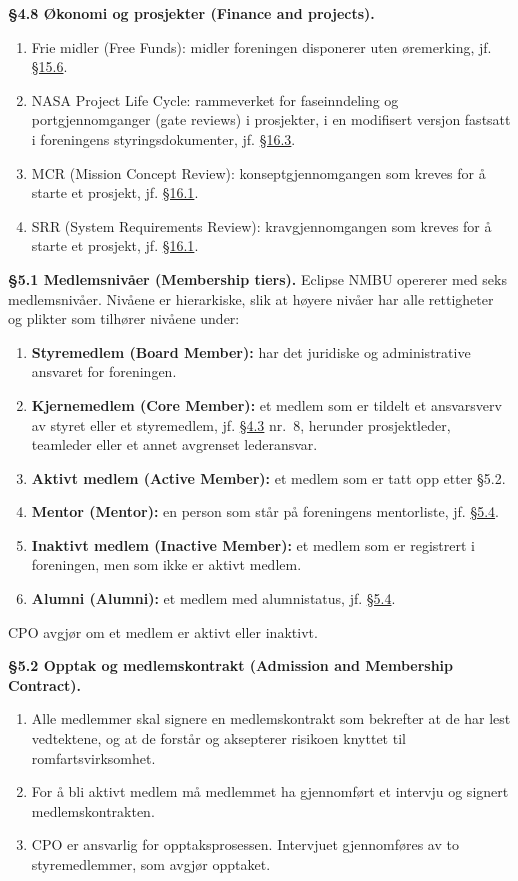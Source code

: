 \documentclass{../../../Common/Latex/Templates/rapport}
\begin{document}
\textbf{\S 4.8 Økonomi og prosjekter (Finance and projects).}\label{bylaw:4.8}
\begin{enumerate}
  \item Frie midler (Free Funds): midler foreningen disponerer uten øremerking, jf. \hyperref[bylaw:15.6]{\S 15.6}.
  \item NASA Project Life Cycle: rammeverket for faseinndeling og portgjennomganger (gate reviews) i prosjekter, i en modifisert versjon fastsatt i foreningens styringsdokumenter, jf. \hyperref[bylaw:16.3]{\S 16.3}.
  \item MCR (Mission Concept Review): konseptgjennomgangen som kreves for å starte et prosjekt, jf. \hyperref[bylaw:16.1]{\S 16.1}.
  \item SRR (System Requirements Review): kravgjennomgangen som kreves for å starte et prosjekt, jf. \hyperref[bylaw:16.1]{\S 16.1}.
\end{enumerate}


\label{bylaw:5}
\textbf{\S 5.1 Medlemsnivåer (Membership tiers).}\label{bylaw:5.1} Eclipse NMBU opererer med seks medlemsnivåer. Nivåene er hierarkiske, slik at høyere nivåer har alle rettigheter og plikter som tilhører nivåene under:
\begin{enumerate}
  \item \textbf{Styremedlem (Board Member):} har det juridiske og administrative ansvaret for foreningen.
  \item \textbf{Kjernemedlem (Core Member):} et medlem som er tildelt et ansvarsverv av styret eller et styremedlem, jf. \hyperref[bylaw:4.3]{\S 4.3} nr.\ 8, herunder prosjektleder, teamleder eller et annet avgrenset lederansvar.
  \item \textbf{Aktivt medlem (Active Member):} et medlem som er tatt opp etter \S5.2.
  \item \textbf{Mentor (Mentor):} en person som står på foreningens mentorliste, jf. \hyperref[bylaw:5.4]{\S 5.4}.
  \item \textbf{Inaktivt medlem (Inactive Member):} et medlem som er registrert i foreningen, men som ikke er aktivt medlem.
  \item \textbf{Alumni (Alumni):} et medlem med alumnistatus, jf. \hyperref[bylaw:5.4]{\S 5.4}.
\end{enumerate}
CPO avgjør om et medlem er aktivt eller inaktivt.

\textbf{\S 5.2 Opptak og medlemskontrakt (Admission and Membership Contract).}\label{bylaw:5.2}
\begin{enumerate}
  \item Alle medlemmer skal signere en medlemskontrakt som bekrefter at de har lest vedtektene, og at de forstår og aksepterer risikoen knyttet til romfartsvirksomhet.
  \item For å bli aktivt medlem må medlemmet ha gjennomført et intervju og signert medlemskontrakten.
  \item CPO er ansvarlig for opptaksprosessen. Intervjuet gjennomføres av to styremedlemmer, som avgjør opptaket.
\end{enumerate}
\end{document}
